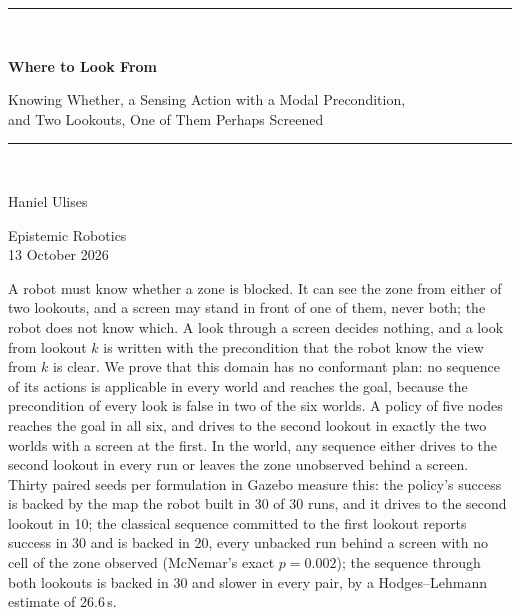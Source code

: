 \documentclass[11pt,a4paper]{article}
\theoremstyle{definition}
\begin{document}
\begin{titlepage}
\centering
\vspace*{2.4cm}
{\color{rulegrey}\rule{\textwidth}{0.8pt}}\\[0.9cm]
{\LARGE\bfseries Where to Look From\par}
\vspace{0.5cm}
{\large\color{slate} Knowing Whether, a Sensing Action with a Modal Precondition,\\
and Two Lookouts, One of Them Perhaps Screened\par}
\vspace{0.7cm}
{\color{rulegrey}\rule{\textwidth}{0.8pt}}\\[1.4cm]

{\large Haniel Ulises\par}
\vspace{0.3cm}
{\color{slate} Epistemic Robotics}\\
\vspace{0.15cm}
{\color{slate}13 October 2026}

\vfill
{\color{slate}\small
A robot must know whether a zone is blocked. It can see the zone from either of
two lookouts, and a screen may stand in front of one of them, never both; the
robot does not know which. A look through a screen decides nothing, and a look
from lookout $k$ is written with the precondition that the robot know the view
from $k$ is clear. We prove that this domain has no conformant plan: no sequence
of its actions is applicable in every world and reaches the goal, because the
precondition of every look is false in two of the six worlds. A policy of five
nodes reaches the goal in all six, and drives to the second lookout in exactly
the two worlds with a screen at the first. In the world, any sequence either
drives to the second lookout in every run or leaves the zone unobserved behind a
screen. Thirty paired seeds per formulation in Gazebo measure this: the policy's success is backed by the map the
robot built in 30 of 30 runs, and it drives to the second lookout in 10; the
classical sequence committed to the first lookout reports success in 30 and is
backed in 20, every unbacked run behind a screen with no cell of the zone
observed (McNemar's exact $p = 0.002$); the sequence through both lookouts is
backed in 30 and slower in every pair, by a Hodges--Lehmann estimate of
26.6\,s.}
\vspace{1.2cm}
\end{titlepage}

\tableofcontents
\newpage
\end{document}
